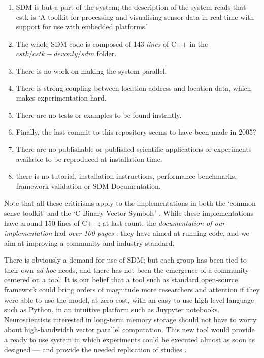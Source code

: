 \documentclass[preprint,12pt, a4paper]{elsarticle}
\begin{document}
\begin{enumerate}
    \item SDM is but a part of the system; the description of the system reads that cstk is `A toolkit for processing and visualising sensor data in real time with support for use with embedded platforms.'

    \item The whole SDM code is composed of 143 \emph{lines} of C++ in the $cstk/cstk-devonly/sdm$ folder.

    \item There is no work on making the system parallel.

    \item There is strong coupling between location address and location data, which makes experimentation hard.

    \item There are no tests or examples to be found instantly.

    \item Finally, the last commit to this repository seems to have been made in 2005?

    \item There are no publishable or published scientific applications or experiments available to be reproduced at installation time.

    \item there is no tutorial, installation instructions, performance benchmarks, framework validation or SDM Documentation.

\end{enumerate}

Note that all these criticisms apply to the implementations in both the `common sense toolkit' and the `C Binary Vector Symbols' \citep{berchtold_processing_2005, noauthor_cstk:_nodate, emruli_vector_2015}.  While these implementations have around 150 lines of C++; at last count, the \emph{documentation of our implementation} had \emph{over 100 pages} \citep{linhares_sparse_2018}: they have aimed at running code, and we aim at improving a community and industry standard.

There is obviously a demand for use of SDM; but each group has been tied to their own \emph{ad-hoc} needs, and there has not been the emergence of a community centered on a tool. It is our belief that a tool such as standard open-source framework could bring orders of magnitude more researchers and attention if they were able to use the model, at zero cost, with an easy to use high-level language such as Python, in an intuitive platform such as Juypyter notebooks. Neuroscientists interested in long-term memory storage should not have to worry about high-bandwidth vector parallel computation.  This new tool would provide a ready to use system in which experiments could be executed almost as soon as designed --- and provide the needed replication of studies \citep{shen2014interactive}.
\end{document}

